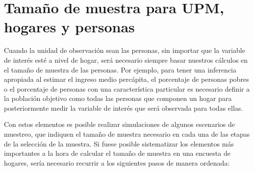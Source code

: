 \documentclass[
  12pt,
  spanish,
]{book}
\begin{document}
\hypertarget{tamauxf1o-de-muestra-para-upm-hogares-y-personas}{%
\section{Tamaño de muestra para UPM, hogares y personas}\label{tamauxf1o-de-muestra-para-upm-hogares-y-personas}}

Cuando la unidad de observación sean las personas, sin importar que la variable de interés esté a nivel de hogar, será necesario siempre basar nuestros cálculos en el tamaño de muestra de las personas. Por ejemplo, para tener una inferencia apropiada al estimar el ingreso medio percápita, el porcentaje de personas pobres o el porcentaje de personas con una característica particular es necesario definir a la población objetivo como todas las personas que componen un hogar para posteriormente medir la variable de interés que será observada para todas ellas.

Con estos elementos es posible realizar simulaciones de algunos escenarios de muestreo, que indiquen el tamaño de muestra necesario en cada una de las etapas de la selección de la muestra. Si fuese posible sistematizar los elementos más importantes a la hora de calcular el tamaño de muestra en una encuesta de hogares, sería necesario recurrir a los siguientes pasos de manera ordenada:
\end{document}
